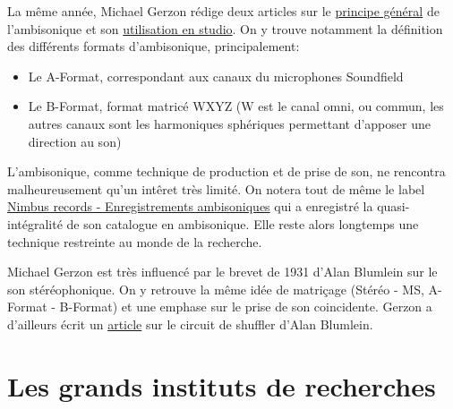 \documentclass[
  letterpaper,
  DIV=11,
  numbers=noendperiod]{scrreprt}
\providecommand{\tightlist}{%
  \setlength{\itemsep}{0pt}\setlength{\parskip}{0pt}}\usepackage{longtable,booktabs,array}
\begin{document}
La même année, Michael Gerzon rédige deux articles sur le
\href{https://www.michaelgerzonphotos.org.uk/articles/Ambisonics\%201.pdf}{principe
général} de l'ambisonique et son
\href{https://intothesoundfield.music.ox.ac.uk/sites/default/files/intothesoundfield/documents/media/ambisonics_2.pdf}{utilisation
en studio}. On y trouve notamment la définition des différents formats
d'ambisonique, principalement:

\begin{itemize}
\tightlist
\item
  Le A-Format, correspondant aux canaux du microphones Soundfield
\item
  Le B-Format, format matricé WXYZ (W est le canal omni, ou commun, les
  autres canaux sont les harmoniques sphériques permettant d'apposer une
  direction au son)
\end{itemize}

L'ambisonique, comme technique de production et de prise de son, ne
rencontra malheureusement qu'un intêret très limité. On notera tout de
même le label \href{https://www.wyastone.co.uk/}{Nimbus records -
Enregistrements ambisoniques} qui a enregistré la quasi-intégralité de
son catalogue en ambisonique. Elle reste alors longtemps une technique
restreinte au monde de la recherche.

\begin{tcolorbox}[enhanced jigsaw, leftrule=.75mm, arc=.35mm, bottomtitle=1mm, colback=white, colbacktitle=quarto-callout-note-color!10!white, opacityback=0, left=2mm, rightrule=.15mm, opacitybacktitle=0.6, breakable, toptitle=1mm, titlerule=0mm, bottomrule=.15mm, toprule=.15mm, coltitle=black, title=\textcolor{quarto-callout-note-color}{\faInfo}\hspace{0.5em}{Note}]

Michael Gerzon est très influencé par le brevet de 1931 d'Alan Blumlein
sur le son stéréophonique. On y retrouve la même idée de matriçage
(Stéréo - MS, A-Format - B-Format) et une emphase sur le prise de son
coincidente. Gerzon a d'ailleurs écrit un
\href{http://decoy.iki.fi/dsound/ambisonic/motherlode/data/6939.pdf}{article}
sur le circuit de shuffler d'Alan Blumlein.

\end{tcolorbox}

\hypertarget{les-grands-instituts-de-recherches}{%
\section{Les grands instituts de
recherches}\label{les-grands-instituts-de-recherches}}
\end{document}

